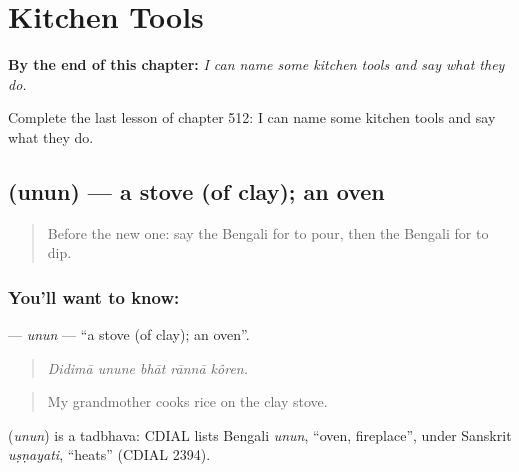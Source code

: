 
\chapter{Kitchen Tools}
\label{ch:bn-kitchen-tools}

\begin{chapteropening}
\textbf{By the end of this chapter:} \emph{I can name some kitchen tools and say what they do.}

Complete the last lesson of chapter 512: I can name some kitchen tools and say what they do.
\end{chapteropening}

\section[\texorpdfstring{\bn{উনুন} (unun)}{উনুন (unun)}]{ (unun) — a stove (of clay); an oven}

\label{lesson:BN-C512-unun}



\begin{quote}
Before the new one: say the Bengali for to pour, then the Bengali for to dip.
\end{quote}

\subsection*{You'll want to know: }
\textbf{} — \emph{unun} — \textquotedblleft{}a stove (of clay); an oven\textquotedblright{}.

\begin{quote}
    
\end{quote}

\begin{quote}
\emph{Didimā unune bhāt rānnā kôren.}
\end{quote}

\begin{quote}
My grandmother cooks rice on the clay stove.
\end{quote}

\begin{cousinweb}
\textbf{} (\emph{unun}) is a tadbhava: CDIAL lists Bengali \emph{unun}, \textquotedblleft{}oven, fireplace\textquotedblright{}, under Sanskrit \emph{uṣṇayati}, \textquotedblleft{}heats\textquotedblright{} (CDIAL 2394).
\end{cousinweb}

